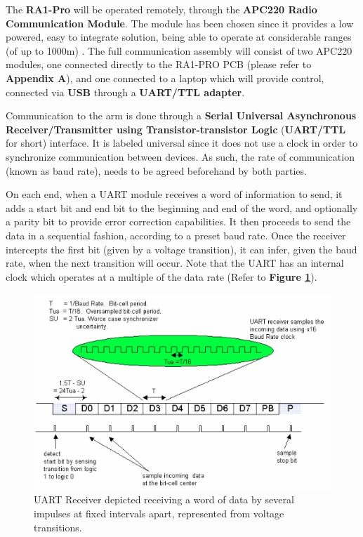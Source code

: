 \documentclass[12p,a4paper]{report}
\begin{document}
The \textbf{RA1-Pro} will be operated remotely, through the \textbf{APC220 Radio Communication Module}. The module has been chosen since it provides a low powered, easy to integrate solution, being able to operate at considerable ranges (of up to 1000m) \cite{apc220range}. The full communication assembly will consist of two APC220 modules, one connected directly to the RA1-PRO PCB (please refer to \textbf{Appendix A}), and one connected to a laptop which will provide control, connected via \textbf{USB} through a \textbf{UART/TTL adapter}. 

Communication to the arm is done through a \textbf{Serial Universal Asynchronous Receiver/Transmitter using Transistor-transistor Logic} (\textbf{UART/TTL} for short) interface.  It is labeled universal since it does not use a clock in order to synchronize communication between devices. As such, the rate of communication (known as baud rate), needs to be agreed beforehand by both parties. 

\newpage
On each end, when a UART module receives a word of information to send, it adds a start bit and end bit to the beginning and end of the word, and optionally a parity bit to provide error correction capabilities. It then proceeds to send the data in a sequential fashion, according to a preset baud rate. Once the receiver intercepts the first bit (given by a voltage transition), it can infer, given the baud rate, when the next transition will occur. Note that the UART has an internal clock which operates at a multiple of the data rate \cite{uart} (Refer to \textbf{Figure \ref{fig:uart}}).

\begin{figure}[H]
\begin{center}
\includegraphics{uartreceiver}
\caption{UART Receiver depicted receiving a word of data by several impulses at fixed intervals apart, represented from voltage transitions.\cite{uart}}
\label{fig:uart}
\end{center}
\end{figure}
\end{document}
